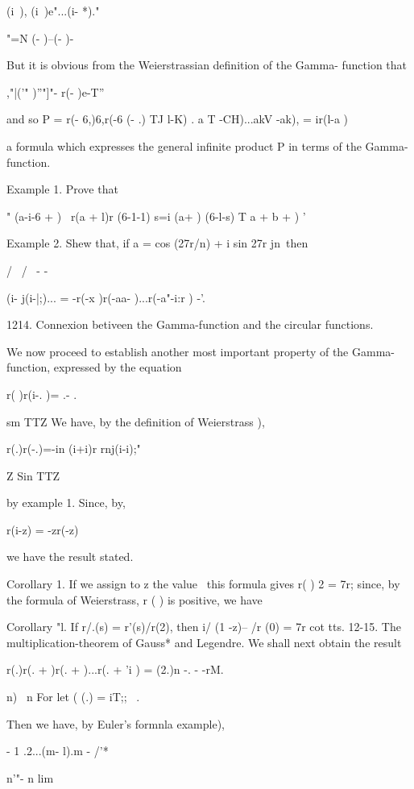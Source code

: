 (i\ ), (i\ )e"...(i- *)."

"=N (- )--(- )-

But it is obvious from the Weierstrassian definition of the Gamma-
function that

,"|('" )''"]"- r(- )e-T''

and so P = r(- 6,)6,r(-6 (- .) TJ l-K) . a T -CH)...akV -ak), =
ir(l-a )

a formula which expresses the general infinite product P in terms of
the Gamma-function.

Example 1. Prove that

 " (a-i-6 + ) \ r(a + l)r (6-1-1) s=i (a+ ) (6-l-s) T a + b + ) '

Example 2. Shew that, if a = cos (27r/n) + i sin 27r jn\ then

/ \ / \ - -

 (i- j(i-|;)... = -r(-x )r(-aa- )...r(-a"-i:r ) -'.

1214. Connexion betiveen the Gamma-function and the circular
functions.

We now proceed to establish another most important property of the
Gamma-function, expressed by the equation

r( )r(i-. )= .- .

sm TTZ We have, by the definition of Weierstrass ),

r(.)r(-.)=-in (i+i)r rnj(i-i);"

Z Sin TTZ

by example 1. Since, by,

r(i-z) = -zr(-z)

we have the result stated.

%
%

Corollary 1. If we assign to z the value \, this formula gives r( ) 2
= 7r; since, by the formula of Weierstrass, r ( ) is positive, we
have

Corollary "l. If r/.(s) = r'(s)/r(2), then i/ (1 -z)-- /r (0) = 7r cot
tts. 12-15. The multiplication-theorem of Gauss* and Legendre. We
shall next obtain the result

r(.)r(. + )r(. + )...r(. + 'i ) = (2.)n -. - -rM.

n) \ n For let ( (.) = iT;; \ .

Then we have, by Euler's formnla  example),

 - 1 .2...(m- l).m - /'*

n'"- n lim

